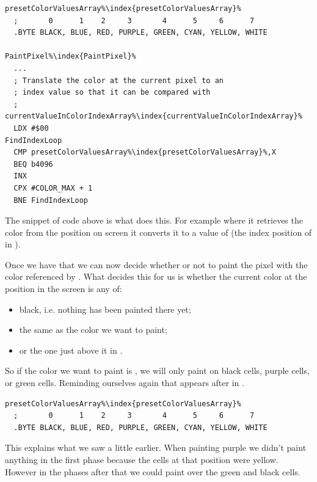 \begin{lstlisting}[escapechar=\%]
presetColorValuesArray%\index{presetColorValuesArray}%
  ;       0      1    2     3       4      5     6      7
  .BYTE BLACK, BLUE, RED, PURPLE, GREEN, CYAN, YELLOW, WHITE

PaintPixel%\index{PaintPixel}%   
  ...
  ; Translate the color at the current pixel to an
  ; index value so that it can be compared with
  ; currentValueInColorIndexArray%\index{currentValueInColorIndexArray}%
  LDX #$00
FindIndexLoop
  CMP presetColorValuesArray%\index{presetColorValuesArray}%,X
  BEQ b4096
  INX 
  CPX #COLOR_MAX + 1
  BNE FindIndexLoop
\end{lstlisting}

The snippet of code above is what does this. For example where it retrieves the color  from the position on screen
it converts it to a value of  (the index position of  in ).

Once we have that we can now decide whether or not to paint the pixel with the color referenced by .
What decides this for us is whether the current color at the position in the screen is any of:
\begin{itemize}
  \item black, i.e. nothing has been painted there yet;
  \item the same as the color we want to paint;
  \item or the one just above it in .
\end{itemize}

So if the color we want to paint is , we will only paint on black cells, purple cells, or green cells. Reminding ourselves
again that  appears after  in .

\begin{lstlisting}[escapechar=\%]
presetColorValuesArray%\index{presetColorValuesArray}%
  ;       0      1    2     3       4      5     6      7
  .BYTE BLACK, BLUE, RED, PURPLE, GREEN, CYAN, YELLOW, WHITE
\end{lstlisting}

This explains what we saw a little earlier. When painting purple we didn't paint anything in the first phase because the cells at that position
were yellow. However in the phases after that we could paint over the green and black cells.


